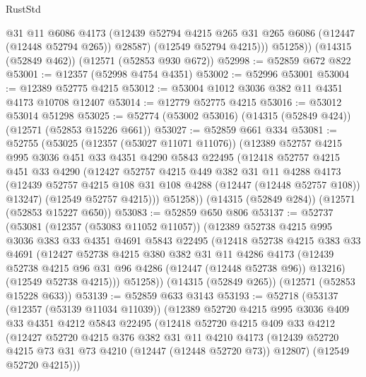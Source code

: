 \begin{lexlean}{RustStd}
\begin{coremodule}
            @31
            @11
            @6086
            @4173
            (@12439 @52794 @4215 @265 @31 @265 @6086 (@12447 (@12448 @52794 @265)) @28587)
            (@12549 @52794 @4215)))
        @51258))
    (@14315 (@52849 @462))
    (@12571 (@52853 @930 @672))
@52998 := @52859 @672 @822
@53001 := @12357 (@52998 @4754 @4351)
@53002 := @52996 @53001
@53004 := @12389 @52775 @4215
@53012 := @53004 @1012 @3036 @382 @11 @4351 @4173 @10708 @12407
@53014 := @12779 @52775 @4215
@53016 := @53012 @53014 @51298
@53025 := @52774 (@53002 @53016) (@14315 (@52849 @424)) (@12571 (@52853 @15226 @661))
@53027 := @52859 @661 @334
@53081 := @52755
    (@53025
      (@12357 (@53027 @11071 @11076))
      (@12389
        @52757
        @4215
        @995
        @3036
        @451
        @33
        @4351
        @4290
        @5843
        @22495
        (@12418
          @52757
          @4215
          @451
          @33
          @4290
          (@12427
            @52757
            @4215
            @449
            @382
            @31
            @11
            @4288
            @4173
            (@12439 @52757 @4215 @108 @31 @108 @4288 (@12447 (@12448 @52757 @108)) @13247)
            (@12549 @52757 @4215)))
        @51258))
    (@14315 (@52849 @284))
    (@12571 (@52853 @15227 @650))
@53083 := @52859 @650 @806
@53137 := @52737
    (@53081
      (@12357 (@53083 @11052 @11057))
      (@12389
        @52738
        @4215
        @995
        @3036
        @383
        @33
        @4351
        @4691
        @5843
        @22495
        (@12418
          @52738
          @4215
          @383
          @33
          @4691
          (@12427
            @52738
            @4215
            @380
            @382
            @31
            @11
            @4286
            @4173
            (@12439 @52738 @4215 @96 @31 @96 @4286 (@12447 (@12448 @52738 @96)) @13216)
            (@12549 @52738 @4215)))
        @51258))
    (@14315 (@52849 @265))
    (@12571 (@52853 @15228 @633))
@53139 := @52859 @633 @3143
@53193 := @52718
    (@53137
      (@12357 (@53139 @11034 @11039))
      (@12389
        @52720
        @4215
        @995
        @3036
        @409
        @33
        @4351
        @4212
        @5843
        @22495
        (@12418
          @52720
          @4215
          @409
          @33
          @4212
          (@12427
            @52720
            @4215
            @376
            @382
            @31
            @11
            @4210
            @4173
            (@12439 @52720 @4215 @73 @31 @73 @4210 (@12447 (@12448 @52720 @73)) @12807)
            (@12549 @52720 @4215)))

\end{coremodule}
\end{lexlean}
